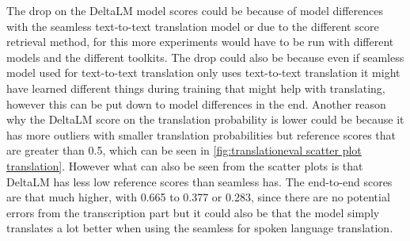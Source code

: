The drop on the DeltaLM model scores could be because of model differences with the seamless text-to-text translation model or due to the different score retrieval method, for this more experiments would have to be run with different models and the different toolkits. 
The drop could also be because even if seamless model used for text-to-text translation only uses text-to-text translation it might have learned different things during training that might help with translating, however this can be put down to model differences in the end. 
Another reason why the DeltaLM score on the translation probability is lower could be because it has more outliers with smaller translation probabilities but reference scores that are greater than 0.5, which can be seen in \autoref{fig:translationeval scatter plot translation}. However what can also be seen from the scatter plots is that DeltaLM has less low reference scores than seamless has. 
The end-to-end scores are that much higher, with 0.665 to 0.377 or 0.283, since there are no potential errors from the transcription part but it could also be that the model simply translates a lot better when using the seamless for spoken language translation. 

